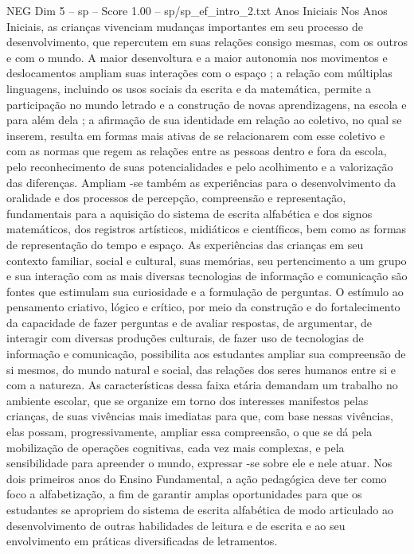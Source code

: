 \begin{textsample}{NEG Dim 5 – sp – Score 1.00 – sp/sp\_ef\_intro\_2.txt}  \label{ex:f5_neg_219}
Anos Iniciais Nos Anos Iniciais, as crianças vivenciam mudanças importantes em seu processo de desenvolvimento, que repercutem em suas relações consigo mesmas, com os outros e com o mundo.
A maior desenvoltura e a maior autonomia nos movimentos e deslocamentos ampliam suas interações com o espaço ; a relação com múltiplas linguagens, incluindo os usos sociais da escrita e da matemática, permite a participação no mundo letrado e a construção de novas aprendizagens, na escola e para além dela ; a afirmação de sua identidade em relação ao coletivo, no qual se inserem, resulta em formas mais ativas de se relacionarem com esse coletivo e com as normas que regem as relações entre as pessoas dentro e fora da escola, pelo reconhecimento de suas potencialidades e pelo acolhimento e a valorização das diferenças.
Ampliam -se também as experiências para o desenvolvimento da oralidade e dos processos de percepção, compreensão e representação, fundamentais para a aquisição do sistema de escrita alfabética e dos signos matemáticos, dos registros artísticos, midiáticos e científicos, bem como as formas de representação do tempo e espaço.
As experiências das crianças em seu contexto familiar, social e cultural, suas memórias, seu pertencimento a um grupo e sua interação com as mais diversas tecnologias de informação e comunicação são fontes que estimulam sua curiosidade e a formulação de perguntas.
O estímulo ao pensamento criativo, lógico e crítico, por meio da construção e do fortalecimento da capacidade de fazer perguntas e de avaliar respostas, de argumentar, de interagir com diversas produções culturais, de fazer uso de tecnologias de informação e comunicação, possibilita aos estudantes ampliar sua compreensão de si mesmos, do mundo natural e social, das relações dos seres humanos entre si e com a natureza.
As características dessa faixa etária demandam um trabalho no ambiente escolar, que se organize em torno dos interesses manifestos pelas crianças, de suas vivências mais imediatas para que, com base nessas vivências, elas possam, progressivamente, ampliar essa compreensão, o que se dá pela mobilização de operações cognitivas, cada vez mais complexas, e pela sensibilidade para apreender o mundo, expressar -se sobre ele e nele atuar.
Nos dois primeiros anos do Ensino Fundamental, a ação pedagógica deve ter como foco a alfabetização, a fim de garantir amplas oportunidades para que os estudantes se apropriem do sistema de escrita alfabética de modo articulado ao desenvolvimento de outras habilidades de leitura e de escrita e ao seu envolvimento em práticas diversificadas de letramentos.

\end{textsample}
